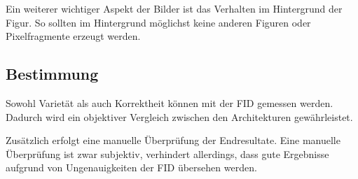 Ein weiterer wichtiger Aspekt der Bilder ist das Verhalten im Hintergrund der Figur.
So sollten im Hintergrund möglichst keine anderen Figuren oder Pixelfragmente erzeugt werden.

\subsection{Bestimmung}
Sowohl Varietät als auch Korrektheit können mit der \acrlong{FID} \cite{frechet-inception-distance} gemessen werden.
Dadurch wird ein objektiver Vergleich zwischen den Architekturen gewährleistet.
\newline

Zusätzlich erfolgt eine manuelle Überprüfung der Endresultate.
Eine manuelle Überprüfung ist zwar subjektiv, verhindert allerdings, dass gute Ergebnisse aufgrund von Ungenauigkeiten der \acrshort{FID} übersehen werden.
